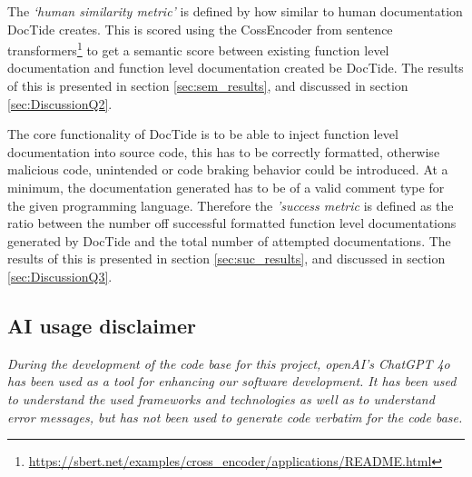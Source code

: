 The \textit{`human similarity metric'} is defined by how similar to human documentation DocTide creates. This is scored using the CossEncoder from sentence transformers\footnote{\url{https://sbert.net/examples/cross_encoder/applications/README.html}} to get a semantic score between existing function level documentation and function level documentation created be DocTide. The results of this is presented in section \ref{sec:sem_results}, and discussed in section \ref{sec:DiscussionQ2}.

The core functionality of DocTide is to be able to inject function level documentation into source code, this has to be correctly formatted, otherwise malicious code, unintended or code braking behavior could be introduced. At a minimum, the documentation generated has to be of a valid comment type for the given programming language. Therefore the \textit{'success metric} is defined as the ratio between the number off successful formatted function level documentations generated by DocTide and the total number of attempted documentations. The results of this is presented in section \ref{sec:suc_results}, and discussed in section \ref{sec:DiscussionQ3}.

\subsection{AI usage disclaimer}
\textit{During the development of the code base for this project, openAI's ChatGPT 4o has been used as a tool for enhancing our software development. It has been used to understand the used frameworks and technologies as well as to understand error messages, but has not been used to generate code verbatim for the code base.
}